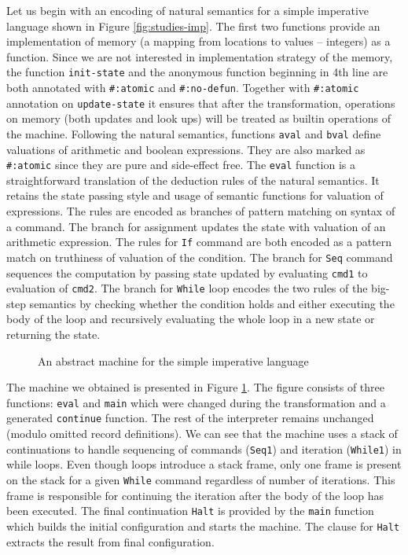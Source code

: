 Let us begin with an encoding of natural semantics for a simple imperative language shown in Figure \ref{fig:studies-imp}.
The first two functions provide an implementation of memory (a mapping from locations to values -- integers) as a function.
Since we are not interested in implementation strategy of the memory, the function \lstinline!init-state! and the anonymous function beginning in 4th line are both annotated with \lstinline!#:atomic! and \lstinline!#:no-defun!.
Together with \lstinline!#:atomic! annotation on \lstinline!update-state! it ensures that after the transformation, operations on memory (both updates and look ups) will be treated as builtin operations of the machine.
Following the natural semantics, functions \lstinline!aval! and \lstinline!bval! define valuations of arithmetic and boolean expressions.
They are also marked as \lstinline!#:atomic! since they are pure and side-effect free.
The \lstinline!eval! function is a straightforward translation of the deduction rules of the natural semantics.
It retains the state passing style and usage of semantic functions for valuation of expressions.
The rules are encoded as branches of pattern matching on syntax of a command.
The branch for assignment updates the state with valuation of an arithmetic expression.
The rules for \lstinline!If! command are both encoded as a pattern match on truthiness of valuation of the condition.
The branch for \lstinline!Seq! command sequences the computation by passing state updated by evaluating \lstinline!cmd1! to evaluation of \lstinline!cmd2!.
The branch for \lstinline!While! loop encodes the two rules of the big-step semantics by checking whether the condition holds and either executing the body of the loop and recursively evaluating the whole loop in a new state or returning the state.

\begin{figure}

\caption{An abstract machine for the simple imperative language}
\label{fig:studies-imp-machine}
\end{figure}

The machine we obtained is presented in Figure \ref{fig:studies-imp-machine}.
The figure consists of three functions: \lstinline!eval! and \lstinline!main! which were changed during the transformation and a generated \lstinline!continue! function.
The rest of the interpreter remains unchanged (modulo omitted record definitions).
We can see that the machine uses a stack of continuations to handle sequencing of commands (\lstinline!Seq1!) and iteration (\lstinline!While1!) in while loops.
Even though loops introduce a stack frame, only one frame is present on the stack for a given \lstinline!While! command regardless of number of iterations.
This frame is responsible for continuing the iteration after the body of the loop has been executed.
The final continuation \lstinline!Halt! is provided by the \lstinline!main! function which builds the initial configuration and starts the machine.
The clause for \lstinline!Halt! extracts the result from final configuration.

